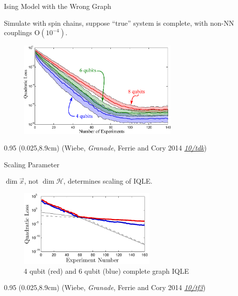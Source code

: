 \documentclass[xcolor=dvipsnames, compress]{beamer}
\renewcommand\UrlFont{\color{red}\rmfamily\itshape}
\newcommand{\shortdoi}[1]{\href{http://doi.org/#1}{\UrlFont 10/#1}}
\newcommand{\OO}{\mathrm{O}}
\newcommand{\Hil}{\mathcal{H}}
\newcommand{\bottomnote}[1]{
  \begin{textblock*}{0.95\paperwidth} (0.025\paperwidth,8.9cm)
    {\tiny \hfill #1}
  \end{textblock*}
}
\begin{document}
\begin{frame}{Ising Model with the Wrong Graph}

  Simulate with spin chains, suppose ``true'' system is complete,
  with non-NN couplings $\OO(10^{-4})$.

  \begin{figure}
    \centering
    \includegraphics[width=0.7\textwidth]{badmodel}
  \end{figure}

  \bottomnote{(Wiebe, \emph{Granade}, Ferrie and Cory 2014 \shortdoi{tdk})}

\end{frame}

\begin{frame}{Scaling Parameter}

  \begin{block}{}
     $\dim \vec{x}$, not $\dim \Hil$, determines scaling of IQLE.
  \end{block}

  \begin{figure}
    \centering
    \includegraphics[width=0.6\textwidth]{corner}
    \caption{4 qubit (red) and 6 qubit (blue) complete graph IQLE}
  \end{figure}

  \bottomnote{(Wiebe, \emph{Granade}, Ferrie and Cory 2014 \shortdoi{tf3})}

\end{frame}
\end{document}
